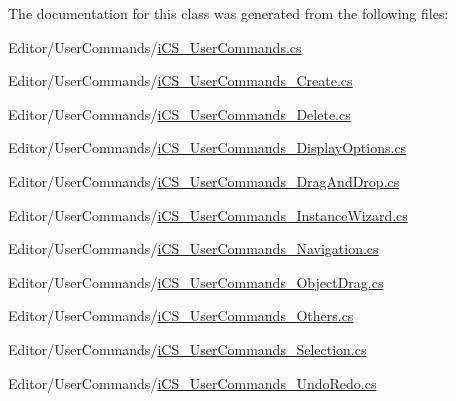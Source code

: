 The documentation for this class was generated from the following files\+:\begin{DoxyCompactItemize}
\item 
Editor/\+User\+Commands/\hyperlink{i_c_s___user_commands_8cs}{i\+C\+S\+\_\+\+User\+Commands.\+cs}\item 
Editor/\+User\+Commands/\hyperlink{i_c_s___user_commands___create_8cs}{i\+C\+S\+\_\+\+User\+Commands\+\_\+\+Create.\+cs}\item 
Editor/\+User\+Commands/\hyperlink{i_c_s___user_commands___delete_8cs}{i\+C\+S\+\_\+\+User\+Commands\+\_\+\+Delete.\+cs}\item 
Editor/\+User\+Commands/\hyperlink{i_c_s___user_commands___display_options_8cs}{i\+C\+S\+\_\+\+User\+Commands\+\_\+\+Display\+Options.\+cs}\item 
Editor/\+User\+Commands/\hyperlink{i_c_s___user_commands___drag_and_drop_8cs}{i\+C\+S\+\_\+\+User\+Commands\+\_\+\+Drag\+And\+Drop.\+cs}\item 
Editor/\+User\+Commands/\hyperlink{i_c_s___user_commands___instance_wizard_8cs}{i\+C\+S\+\_\+\+User\+Commands\+\_\+\+Instance\+Wizard.\+cs}\item 
Editor/\+User\+Commands/\hyperlink{i_c_s___user_commands___navigation_8cs}{i\+C\+S\+\_\+\+User\+Commands\+\_\+\+Navigation.\+cs}\item 
Editor/\+User\+Commands/\hyperlink{i_c_s___user_commands___object_drag_8cs}{i\+C\+S\+\_\+\+User\+Commands\+\_\+\+Object\+Drag.\+cs}\item 
Editor/\+User\+Commands/\hyperlink{i_c_s___user_commands___others_8cs}{i\+C\+S\+\_\+\+User\+Commands\+\_\+\+Others.\+cs}\item 
Editor/\+User\+Commands/\hyperlink{i_c_s___user_commands___selection_8cs}{i\+C\+S\+\_\+\+User\+Commands\+\_\+\+Selection.\+cs}\item 
Editor/\+User\+Commands/\hyperlink{i_c_s___user_commands___undo_redo_8cs}{i\+C\+S\+\_\+\+User\+Commands\+\_\+\+Undo\+Redo.\+cs}\end{DoxyCompactItemize}
